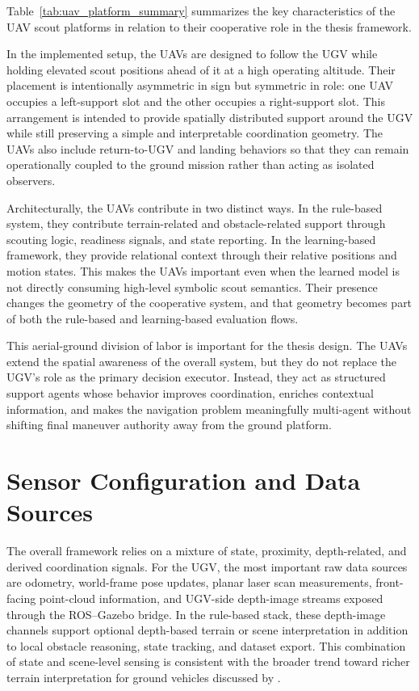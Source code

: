 Table~\ref{tab:uav_platform_summary} summarizes the key characteristics of the UAV scout platforms in relation to their cooperative role in the thesis framework.

In the implemented setup, the UAVs are designed to follow the UGV while holding elevated scout positions ahead of it at a high operating altitude. Their placement is intentionally asymmetric in sign but symmetric in role: one UAV occupies a left-support slot and the other occupies a right-support slot. This arrangement is intended to provide spatially distributed support around the UGV while still preserving a simple and interpretable coordination geometry. The UAVs also include return-to-UGV and landing behaviors so that they can remain operationally coupled to the ground mission rather than acting as isolated observers.

Architecturally, the UAVs contribute in two distinct ways. In the rule-based system, they contribute terrain-related and obstacle-related support through scouting logic, readiness signals, and state reporting. In the learning-based framework, they provide relational context through their relative positions and motion states. This makes the UAVs important even when the learned model is not directly consuming high-level symbolic scout semantics. Their presence changes the geometry of the cooperative system, and that geometry becomes part of both the rule-based and learning-based evaluation flows.

This aerial-ground division of labor is important for the thesis design. The UAVs extend the spatial awareness of the overall system, but they do not replace the UGV's role as the primary decision executor. Instead, they act as structured support agents whose behavior improves coordination, enriches contextual information, and makes the navigation problem meaningfully multi-agent without shifting final maneuver authority away from the ground platform.

\section{Sensor Configuration and Data Sources}

The overall framework relies on a mixture of state, proximity, depth-related, and derived coordination signals. For the UGV, the most important raw data sources are odometry, world-frame pose updates, planar laser scan measurements, front-facing point-cloud information, and UGV-side depth-image streams exposed through the ROS--Gazebo bridge. In the rule-based stack, these depth-image channels support optional depth-based terrain or scene interpretation in addition to local obstacle reasoning, state tracking, and dataset export. This combination of state and scene-level sensing is consistent with the broader trend toward richer terrain interpretation for ground vehicles discussed by \citeauthor{chen2021cnn} \citep{chen2021cnn}.

